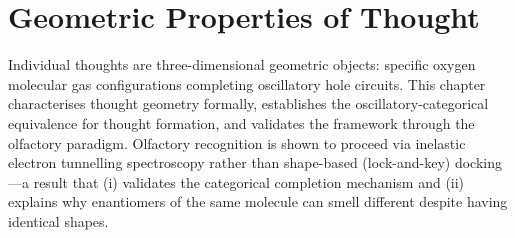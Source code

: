 \chapter{Geometric Properties of Thought}
\label{ch:thought_geometry}


\begin{chapterabstract}
Individual thoughts are three-dimensional geometric objects: specific oxygen molecular gas configurations completing oscillatory hole circuits. This chapter characterises thought geometry formally, establishes the oscillatory-categorical equivalence for thought formation, and validates the framework through the olfactory paradigm. Olfactory recognition is shown to proceed via inelastic electron tunnelling spectroscopy rather than shape-based (lock-and-key) docking---a result that (i) validates the categorical completion mechanism and (ii) explains why enantiomers of the same molecule can smell different despite having identical shapes.
\end{chapterabstract}


